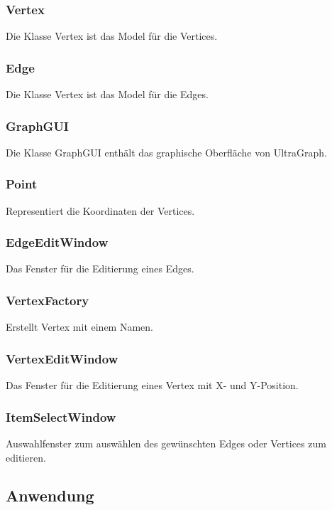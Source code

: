 \documentclass[a4paper,titlepage]{article}
\begin{document}
\subsubsection{Vertex}

Die Klasse Vertex ist das Model für die Vertices.

\subsubsection{Edge}

Die Klasse Vertex ist das Model für die Edges.

\subsubsection{GraphGUI}

Die Klasse GraphGUI enthält das graphische Oberfläche von UltraGraph.

\subsubsection{Point}

Representiert die Koordinaten der Vertices.

\subsubsection{EdgeEditWindow}

Das Fenster für die Editierung eines Edges.

\subsubsection{VertexFactory}

Erstellt Vertex mit einem Namen.

\subsubsection{VertexEditWindow}

Das Fenster für die Editierung eines Vertex mit X- und Y-Position.

\subsubsection{ItemSelectWindow}

Auswahlfenster zum auswählen des gewünschten Edges oder Vertices zum editieren.

\subsection{Anwendung}
\end{document}
